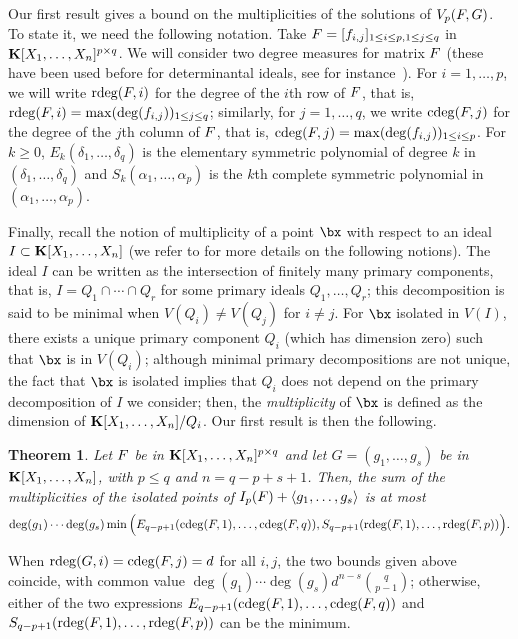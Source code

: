 \documentclass[12pt]{article}
\newtheorem{theorem}[definition]{Theorem}
\begin{document}
Our first result gives a bound on the multiplicities of the solutions
of $V_{p}({F},G)$. To state it, we need the following notation.
Take ${F}=[f_{i,j}]_{1 \le i \le p, 1 \le j \le q}$ in
$\mathbf{K}[X_1,\dots,X_n]^{p \times q}$.  We will consider two degree
measures for matrix ${F}$ (these have been used before for
determinantal ideals, see for instance~\cite{NieRan09,MiSt04}). For
$i=1,\dots,p$, we will write $\mathrm{rdeg}({F},i)$ for the degree of the
$i$th row of ${F}$, that is, $\mathrm{rdeg}({F},i)=\max(\deg(f_{i,j}))_{1 \le
  j \le q}$; similarly, for $j=1,\dots,q$, we write $\mathrm{cdeg}({F},j)$ for
the degree of the $j$th column of ${F}$, that is,
$\mathrm{cdeg}({F},j)=\max(\deg(f_{i,j}))_{1 \le i \le p}$. For $k \ge 0$,
$E_k(\delta_1,\dots,\delta_q)$ is the elementary symmetric polynomial
of degree $k$ in $(\delta_1, \ldots, \delta_q)$ and
$S_k(\alpha_1,\dots,\alpha_p)$ is the $k$th complete symmetric
polynomial in $(\alpha_1,\dots,\alpha_p)$.

Finally, recall the notion of multiplicity of a point $\bx$ with
respect to an ideal $I \subset\mathbf{K}[X_1,\dots,X_n]$ (we refer to
\cite{Eisenbud95} for more details on the following notions).  The
ideal $I$ can be written as the intersection of finitely many primary
components, that is, $I=Q_1\cap\cdots \cap Q_r$ for some primary
ideals $Q_1,\dots,Q_r$; this decomposition is said to be minimal when
$V(Q_i)\neq V(Q_j)$ for $i\neq j$. For $\bx$  isolated in $V(I)$, there
exists a unique primary component $Q_i$ (which has dimension zero)
such that $\bx$ is in $V(Q_i)$; although minimal primary decompositions
are not unique, the fact that $\bx$ is isolated implies that $Q_i$
does not depend on the primary decomposition of $I$ we consider; then,
the \emph{multiplicity} of $\bx$ is defined as the dimension of
$\mathbf{K}[X_1,\dots,X_n]/Q_i$. Our first result is then the following.

\begin{theorem}\label{theo:1}
  Let ${F}$ be in $\mathbf{K}[X_1,\dots,X_n]^{p \times q}$ and let
  $G=(g_1,\dots,g_s)$ be in $\mathbf{K}[X_1,\dots,X_n]$, with $p \le q$ and
  $n=q-p+s+1$. Then, the sum of the multiplicities of the isolated
  points of $I_p({F}) + \langle g_1,\dots,g_s \rangle$ is at most
  $$\deg(g_1) \cdots \deg(g_s) \min\Big(E_{q-p+1}(\mathrm{cdeg}({F},1), \ldots, \mathrm{cdeg}({F},q)), S_{q-p+1}(\mathrm{rdeg}({F},1), \ldots, \mathrm{rdeg}({F},p))\Big).$$
\end{theorem}
When $\mathrm{rdeg}({G},i)=\mathrm{cdeg}({F},j)=d$ for all $i,j$, the two bounds given
above coincide, with common value $\deg(g_1) \cdots \deg(g_s) d^{n-s}
{q \choose {p-1}}$; otherwise, either of the two expressions
$E_{q-p+1}(\mathrm{cdeg}({F},1), \ldots, \mathrm{cdeg}({F},q))$ and
$S_{q-p+1}(\mathrm{rdeg}({F},1), \ldots, \mathrm{rdeg}({F},p))$ can be the
minimum.
\end{document}

